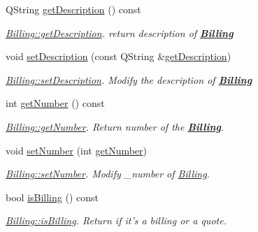 \begin{DoxyCompactItemize}
Q\-String \hyperlink{classModels_1_1Billing_a5802215da8f4407457b8aeb7be525c65}{get\-Description} () const 
\begin{DoxyCompactList}\small\item\em \hyperlink{classModels_1_1Billing_a5802215da8f4407457b8aeb7be525c65}{Billing\-::get\-Description}. return description of {\bfseries \hyperlink{classModels_1_1Billing}{Billing}} \end{DoxyCompactList}\item 
void \hyperlink{classModels_1_1Billing_adb5cf4382150387f10bb6b774ace6bc8}{set\-Description} (const Q\-String \&\hyperlink{classModels_1_1Billing_a5802215da8f4407457b8aeb7be525c65}{get\-Description})
\begin{DoxyCompactList}\small\item\em \hyperlink{classModels_1_1Billing_adb5cf4382150387f10bb6b774ace6bc8}{Billing\-::set\-Description}. Modify the description of {\bfseries \hyperlink{classModels_1_1Billing}{Billing}} \end{DoxyCompactList}\item 
int \hyperlink{classModels_1_1Billing_a48c6e28a4aec13f8ed6b3ebbab837f0b}{get\-Number} () const 
\begin{DoxyCompactList}\small\item\em \hyperlink{classModels_1_1Billing_a48c6e28a4aec13f8ed6b3ebbab837f0b}{Billing\-::get\-Number}. Return number of the {\bfseries \hyperlink{classModels_1_1Billing}{Billing}}. \end{DoxyCompactList}\item 
void \hyperlink{classModels_1_1Billing_a2b43e0c657a9e717c9d2c091d222369e}{set\-Number} (int \hyperlink{classModels_1_1Billing_a48c6e28a4aec13f8ed6b3ebbab837f0b}{get\-Number})
\begin{DoxyCompactList}\small\item\em \hyperlink{classModels_1_1Billing_a2b43e0c657a9e717c9d2c091d222369e}{Billing\-::set\-Number}. Modify {\itshape \-\_\-number} of \hyperlink{classModels_1_1Billing}{Billing}. \end{DoxyCompactList}\item 
bool \hyperlink{classModels_1_1Billing_ab03dd29a9812a995355a1d93318f348f}{is\-Billing} () const 
\begin{DoxyCompactList}\small\item\em \hyperlink{classModels_1_1Billing_ab03dd29a9812a995355a1d93318f348f}{Billing\-::is\-Billing}. Return if it's a billing or a quote. \end{DoxyCompactList}\item 

\end{DoxyCompactItemize}
